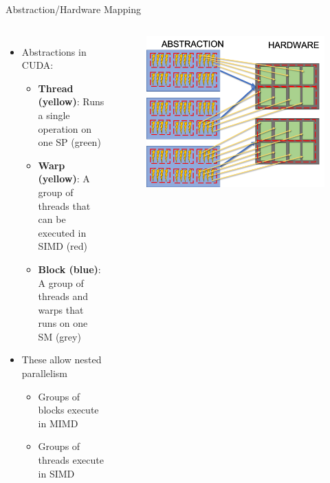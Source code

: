 \documentclass{beamer}
\begin{document}
    \begin{frame}{Abstraction/Hardware Mapping}
        \begin{columns}
            \begin{itemize}
                \item Abstractions in CUDA:
                \begin{itemize}
                    \item \textbf{Thread (yellow)}: Runs a single operation on one SP (green)
                    \item \textbf{Warp (yellow)}: A group of threads that can be executed in SIMD (red)
                    \item \textbf{Block (blue)}: A group of threads and warps that runs on one SM (grey)
                \end{itemize}
                \item These allow nested parallelism
                \begin{itemize}
                    \item Groups of blocks execute in MIMD
                    \item Groups of threads execute in SIMD
                \end{itemize}
            \end{itemize}
            \begin{figure}
                \centering
                \includegraphics[width=\textwidth]{img/03/gpu-hard-abs.png}
            \end{figure}
        \end{columns}
    \end{frame}
\end{document}
